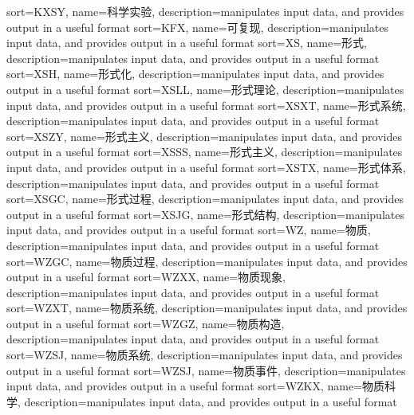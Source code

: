 {
  sort=KXSY,
  name=科学实验,
  description={manipulates input data, and provides output in a useful format}
}
{
  sort=KFX,
  name=可复现,
  description={manipulates input data, and provides output in a useful format}
}
{
  sort=XS,
  name=形式,
  description={manipulates input data, and provides output in a useful format}
}
{
  sort=XSH,
  name=形式化,
  description={manipulates input data, and provides output in a useful format}
}
{
  sort=XSLL,
  name=形式理论,
  description={manipulates input data, and provides output in a useful format}
}
{
  sort=XSXT,
  name=形式系统,
  description={manipulates input data, and provides output in a useful format}
}
{
  sort=XSZY,
  name=形式主义,
  description={manipulates input data, and provides output in a useful format}
}
{
  sort=XSSS,
  name=形式主义,
  description={manipulates input data, and provides output in a useful format}
}
{
  sort=XSTX,
  name=形式体系,
  description={manipulates input data, and provides output in a useful format}
}
{
  sort=XSGC,
  name=形式过程,
  description={manipulates input data, and provides output in a useful format}
}
{
  sort=XSJG,
  name=形式结构,
  description={manipulates input data, and provides output in a useful format}
}
{
  sort=WZ,
  name=物质,
  description={manipulates input data, and provides output in a useful format}
}
{
  sort=WZGC,
  name=物质过程,
  description={manipulates input data, and provides output in a useful format}
}
{
  sort=WZXX,
  name=物质现象,
  description={manipulates input data, and provides output in a useful format}
}
{
  sort=WZXT,
  name=物质系统,
  description={manipulates input data, and provides output in a useful format}
}
{
  sort=WZGZ,
  name=物质构造,
  description={manipulates input data, and provides output in a useful format}
}
{
  sort=WZSJ,
  name=物质系统,
  description={manipulates input data, and provides output in a useful format}
}
{
  sort=WZSJ,
  name=物质事件,
  description={manipulates input data, and provides output in a useful format}
}
{
  sort=WZKX,
  name=物质科学,
  description={manipulates input data, and provides output in a useful format}
}
